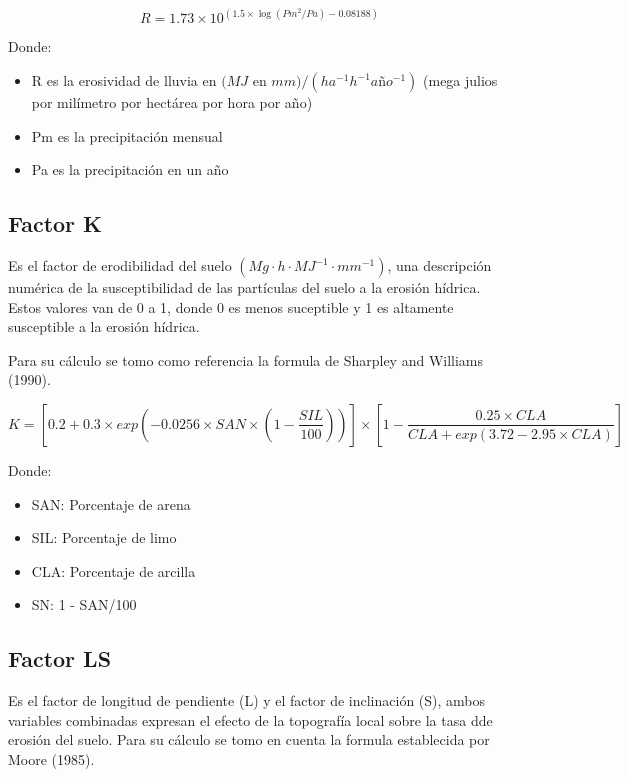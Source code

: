 \documentclass[
  letterpaper,
  DIV=11,
  numbers=noendperiod]{scrreprt}
\providecommand{\tightlist}{%
  \setlength{\itemsep}{0pt}\setlength{\parskip}{0pt}}\usepackage{longtable,booktabs,array}
\begin{document}
\begin{equation}
    R = 1.73 \times 10^{(1.5\times\log(Pm^2/Pa)-0.08188)}   
\end{equation}

Donde:

\begin{itemize}
\tightlist
\item
  R es la erosividad de lluvia en \((MJ\) en
  \(mm)/(ha^{-1} h^{-1} año^{-1})\) (mega julios por milímetro por
  hectárea por hora por año)
\item
  Pm es la precipitación mensual
\item
  Pa es la precipitación en un año
\end{itemize}

\hypertarget{factor-k}{%
\subsection{Factor K}\label{factor-k}}

Es el factor de erodibilidad del suelo \((Mg·h·MJ^{−1}·mm^{−1})\), una
descripción numérica de la susceptibilidad de las partículas del suelo a
la erosión hídrica. Estos valores van de 0 a 1, donde 0 es menos
suceptible y 1 es altamente susceptible a la erosión hídrica.

Para su cálculo se tomo como referencia la formula de Sharpley and
Williams (1990).

\begin{equation}
    K = [0.2 + 0.3 \times exp(-0.0256 \times SAN \times (1 - \frac{SIL}{100}))]\times[1-\frac{0.25\times CLA}{CLA + exp(3.72 - 2.95\times CLA)}]  
\end{equation}

Donde:

\begin{itemize}
\item
  SAN: Porcentaje de arena
\item
  SIL: Porcentaje de limo
\item
  CLA: Porcentaje de arcilla
\item
  SN: 1 - SAN/100
\end{itemize}

\hypertarget{factor-ls}{%
\subsection{Factor LS}\label{factor-ls}}

Es el factor de longitud de pendiente (L) y el factor de inclinación
(S), ambos variables combinadas expresan el efecto de la topografía
local sobre la tasa dde erosión del suelo. Para su cálculo se tomo en
cuenta la formula establecida por Moore (1985).
\end{document}
